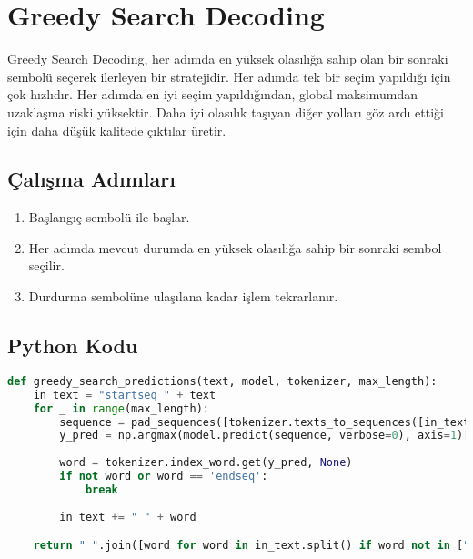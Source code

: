 \section{Greedy Search Decoding}
Greedy Search Decoding, her adımda en yüksek olasılığa sahip olan bir sonraki sembolü seçerek ilerleyen bir stratejidir. Her adımda tek bir seçim yapıldığı için çok hızlıdır. Her adımda en iyi seçim yapıldığından, global maksimumdan uzaklaşma riski yüksektir. Daha iyi olasılık taşıyan diğer yolları göz ardı ettiği için daha düşük kalitede çıktılar üretir. 

\subsection{Çalışma Adımları}
\begin{enumerate}
	\item Başlangıç sembolü ile başlar.
	\item Her adımda mevcut durumda en yüksek olasılığa sahip bir sonraki sembol seçilir.
	\item Durdurma sembolüne ulaşılana kadar işlem tekrarlanır.
\end{enumerate}

\subsection{Python Kodu}

\begin{lstlisting}[language=Python]
def greedy_search_predictions(text, model, tokenizer, max_length):
    in_text = "startseq " + text
    for _ in range(max_length):
        sequence = pad_sequences([tokenizer.texts_to_sequences([in_text])[0]], max_length)
        y_pred = np.argmax(model.predict(sequence, verbose=0), axis=1)[0]
        
        word = tokenizer.index_word.get(y_pred, None)
        if not word or word == 'endseq':
            break
    
        in_text += " " + word

    return " ".join([word for word in in_text.split() if word not in ["startseq", "endseq", "<OOV>"]])
\end{lstlisting}

\newpage
